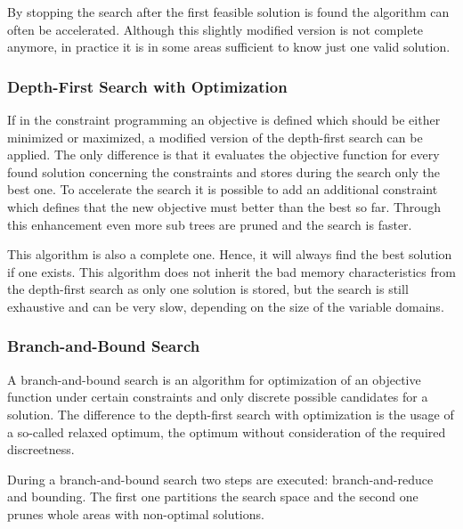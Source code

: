 \documentclass[10pt,
               a4paper,
               journal,
               ]{IEEEtran}
\begin{document}
	By stopping the search after the first feasible solution is found the algorithm can often be accelerated. Although this slightly modified version is not complete anymore, in practice it is in some areas sufficient to know just one valid solution.
	
	\subsubsection{Depth-First Search with Optimization}
	If in the constraint programming an objective is defined which should be either minimized or maximized, a modified version of the depth-first search can be applied. The only difference is that it evaluates the objective function for every found solution concerning the constraints and stores during the search only the best one. To accelerate the search it is possible to add an additional constraint which defines that the new objective must better than the best so far. Through this enhancement even more sub trees are pruned and the search is faster.
	
	This algorithm is also a complete one. Hence, it will always find the best solution if one exists. This algorithm does not inherit the bad memory characteristics from the depth-first search as only one solution is stored, but the search is still exhaustive and can be very slow, depending on the size of the variable domains.
	
	\subsubsection{Branch-and-Bound Search}
	A branch-and-bound search is an algorithm for optimization of an objective function under certain constraints and only discrete possible candidates for a solution. The difference to the depth-first search with optimization is the usage of a so-called relaxed optimum, the optimum without consideration of the required discreetness.
	
	During a branch-and-bound search two steps are executed: branch-and-reduce and bounding. The first one partitions the search space and the second one prunes whole areas with non-optimal solutions.
	
\end{document}
